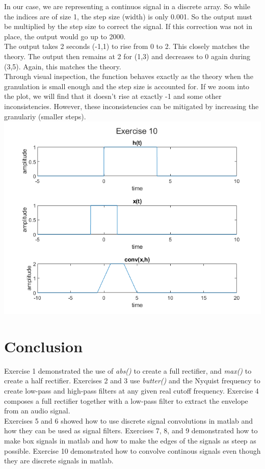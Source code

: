 \documentclass[11pt]{article}
\begin{document}
In our case, we are representing a continuos signal in a discrete array.
So while the indices are of size 1, the step size (width) is only 0.001.
So the output must be multiplied by the step size to correct the signal.
If this correction was not in place, the output would go up to 2000.\\

The output takes 2 seconds (-1,1) to rise from 0 to 2.
This closely matches the theory.
The output then remains at 2 for (1,3) and decreases to 0 again during (3,5).
Again, this matches the theory.\\

Through visual inspection, the function behaves exactly as the theory when the granulation is small enough and the step size is accounted for.
If we zoom into the plot, we will find that it doesn't rise at exactly -1 and some other inconsistencies.
However, these inconsistencies can be mitigated by increasing the granulariy (smaller steps).\\ 



\includegraphics[width=\textwidth]{exercise10.png}

\section{Conclusion}

Exercise 1 demonstrated the use of \textit{abs()} to create a full rectifier, and \textit{max()} to create a half rectifier.
Exercises 2 and 3 use \textit{butter()} and the Nyquist frequency to create low-pass and high-pass filters at any given real cutoff frequency.
Exercise 4 composes a full rectifier together with a low-pass filter to extract the envelope from an audio signal.\\

Exercises 5 and 6 showed how to use discrete signal convolutions in matlab and how they can be used as signal filters.
Exercises 7, 8, and 9 demonstrated how to make box signals in matlab and how to make the edges of the signals as steep as possible.
Exercise 10 demonstrated how to convolve continous signals even though they are discrete signals in matlab.\\
\end{document}
